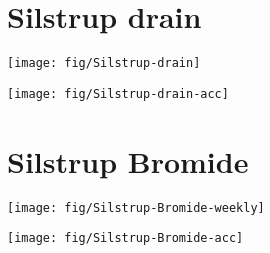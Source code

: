 \documentclass[fullpage,a4paper]{article}
\begin{document}
\section*{Silstrup drain}

\texttt{[image: fig/Silstrup-drain]}

\texttt{[image: fig/Silstrup-drain-acc]}

\section*{Silstrup Bromide}

\texttt{[image: fig/Silstrup-Bromide-weekly]}

\texttt{[image: fig/Silstrup-Bromide-acc]}
\end{document}
